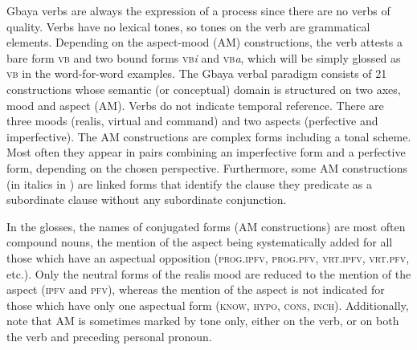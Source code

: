 \documentclass[output=paper,colorlinks=true, citecolor=brown]{langscibook}
\begin{document}
Gbaya verbs are always the expression of a process since there are no verbs of quality. Verbs have no lexical tones, so tones on the verb are grammatical elements. Depending on the aspect-mood (AM) constructions, the verb attests a bare form {\textsc{vb}} and two bound forms \textsc{vb}\textit{i} and \textsc{vb}\textit{a}, which will be simply glossed as \textsc{vb} in the word-for-word examples. The Gbaya verbal paradigm consists of 21 constructions whose semantic (or conceptual) domain is structured on two axes, mood and aspect (AM). Verbs do not indicate temporal reference. There are three moods (realis, virtual and command) and two aspects (perfective and imperfective). The AM constructions are complex forms including a tonal scheme. Most often they appear in pairs combining an imperfective form and a perfective form, depending on the chosen perspective. Furthermore, some AM constructions (in italics in ) are linked forms that identify the clause they predicate as a subordinate clause without any subordinate conjunction. 

In the glosses, the names of conjugated forms (AM constructions) are most often compound nouns, the mention of the aspect being systematically added for all those which have an aspectual opposition (\textsc{prog.ipfv}, \textsc{prog.pfv}, \textsc{vrt.ipfv}, \textsc{vrt.pfv}, etc.). Only the neutral forms of the realis mood are reduced to the mention of the aspect (\textsc{ipfv} and \textsc{pfv}), whereas the mention of the aspect is not indicated for those which have only one aspectual form (\textsc{know}, \textsc{hypo}, \textsc{cons}, \textsc{inch}).
Additionally, note that AM is sometimes marked by tone only, either on the verb, or on both the verb and preceding personal pronoun.
%

\end{document}
